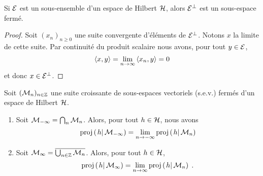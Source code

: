 \begin{theorem}\label{thm:ortho_is_closed}
Si $\cal E$ est un sous-ensemble d'un espace de Hilbert $\cal H$,
alors ${\cal E}^{\perp}$ est un sous-espace ferm\'{e}.
\end{theorem}
\begin{proof}\smartqed
Soit $(x_n)_{n \geq 0}$ une suite convergente d'\'{e}l\'{e}ments de
${\cal E}^{\perp}$. Notons $x$ la limite de cette suite. Par
continuit\'{e} du produit scalaire nous avons, pour tout $y\in \mathcal{E}$,
\[
\left\langle x, y \right\rangle = \lim_{n \rightarrow \infty} \left\langle x_n, y \right\rangle = 0
\]
et donc $x \in \mathcal{E}^\perp$.

\end{proof}

\begin{theorem}
Soit $(\mathcal{M}_n)_{n\in\mathbb{Z}}$ une suite croissante
de sous-espaces vectoriels (s.e.v.) ferm\'{e}s d'un espace de
Hilbert $\mathcal{H}$.
\begin{enumerate}[label=\emph{\alph*})]
   \item \label{it:intersection_hilbert}
Soit $\mathcal{M}_{-\infty} = \bigcap_n \mathcal{M}_n$. Alors,
pour tout $h \in \mathcal{H}$, nous avons
\[
\proj{h}{\cM_{-\infty}}= \lim_{n \rightarrow - \infty} \proj{h}{\cM_n}
\]
   \item \label{it:union_fermee_hilbert}
Soit $\mathcal{M}_\infty = \overline{\bigcup_{n \in \mathbb{Z}} \mathcal{M}_n}$.
Alors, pour tout $h \in \mathcal{H}$,
\[
\proj{h}{\cM_\infty}= \limn \proj{h}{\cM_n} \eqsp.
\]
\end{enumerate}
\end{theorem}
